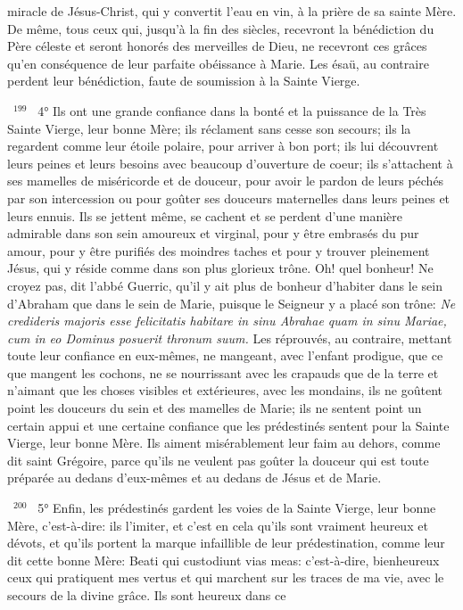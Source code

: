 \documentclass[paper=a5,pagesize=pdftex,fontsize=15pt,headinclude=on,twoside=off]{scrbook}
\newcommand{\negphantom}[1]{\settowidth{\dimen0}{#1}\hspace*{-\dimen0}}
\newcommand{\versenb}[1]{\par \vspace{10pt}~\negphantom{~${}^{#1}$~}${}^{#1}$~}
\newcommand{\latin}[1]{\emph{#1}}
\begin{document}
miracle de Jésus-Christ, qui y convertit l'eau en vin, à la prière de sa sainte Mère. De même, tous ceux qui, jusqu'à
la fin des siècles, recevront la bénédiction du Père céleste et seront honorés des merveilles de Dieu, ne recevront
ces grâces qu'en conséquence de leur parfaite obéissance à Marie. Les ésaü, au contraire perdent leur
bénédiction, faute de soumission à la Sainte Vierge.
\versenb{199} 4° Ils ont une grande confiance dans la bonté et la puissance de la Très Sainte Vierge, leur bonne Mère; ils
réclament sans cesse son secours; ils la regardent comme leur étoile polaire, pour arriver à bon port; ils lui
découvrent leurs peines et leurs besoins avec beaucoup d'ouverture de coeur; ils s'attachent à ses mamelles de
miséricorde et de douceur, pour avoir le pardon de leurs péchés par son intercession ou pour goûter ses douceurs
maternelles dans leurs peines et leurs ennuis. Ils se jettent même, se cachent et se perdent d'une manière
admirable dans son sein amoureux et virginal, pour y être embrasés du pur amour, pour y être purifiés des
moindres taches et pour y trouver pleinement Jésus, qui y réside comme dans son plus glorieux trône. Oh! quel
bonheur! Ne croyez pas, dit l'abbé Guerric, qu'il y ait plus de bonheur d'habiter dans le sein d'Abraham que dans le
sein de Marie, puisque le Seigneur y a placé son trône: \latin{Ne credideris majoris esse felicitatis habitare in sinu
Abrahae quam in sinu Mariae, cum in eo Dominus posuerit thronum suum.}
Les réprouvés, au contraire, mettant toute leur confiance en eux-mêmes, ne mangeant, avec l'enfant prodigue, que
ce que mangent les cochons, ne se nourrissant avec les crapauds que de la terre et n'aimant que les choses
visibles et extérieures, avec les mondains, ils ne goûtent point les douceurs du sein et des mamelles de Marie; ils
ne sentent point un certain appui et une certaine confiance que les prédestinés sentent pour la Sainte Vierge, leur
bonne Mère. Ils aiment misérablement leur faim au dehors, comme dit saint Grégoire, parce qu'ils ne veulent pas
goûter la douceur qui est toute préparée au dedans d'eux-mêmes et au dedans de Jésus et de Marie.
\versenb{200} 5° Enfin, les prédestinés gardent les voies de la Sainte Vierge, leur bonne Mère, c'est-à-dire: ils l'imiter, et
c'est en cela qu'ils sont vraiment heureux et dévots, et qu'ils portent la marque infaillible de leur prédestination,
comme leur dit cette bonne Mère: Beati qui custodiunt vias meas: c'est-à-dire, bienheureux ceux qui pratiquent
mes vertus et qui marchent sur les traces de ma vie, avec le secours de la divine grâce. Ils sont heureux dans ce
\end{document}

